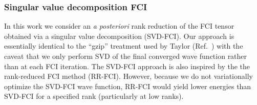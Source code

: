 \documentclass[aip,jcp,amsmath,amssymb, reprint]{revtex4-1}
\begin{document}
\subsubsection{\label{sec:SVD-FCI}Singular value decomposition FCI}

In this work we consider an \textit{a posteriori} rank reduction of the FCI tensor obtained via a singular value decomposition (SVD-FCI). 
Our approach is essentially identical to the ``gzip'' treatment used by Taylor (Ref.~) with the caveat that we only perform SVD of the final converged wave function rather than at each FCI iteration.
The SVD-FCI approach is also inspired by the the rank-reduced FCI method (RR-FCI).\cite{Koch1992AVariational,Fales2018LargeScale} 
However, because we do not variationally optimize the SVD-FCI wave function, RR-FCI would yield lower energies than SVD-FCI for a specified rank (particularly at low ranks).
\end{document}
